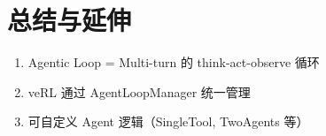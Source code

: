 \section{总结与延伸}
\begin{enumerate}
  \item Agentic Loop = Multi-turn 的 think-act-observe 循环
  \item veRL 通过 AgentLoopManager 统一管理
  \item 可自定义 Agent 逻辑（SingleTool, TwoAgents 等）
\end{enumerate}

